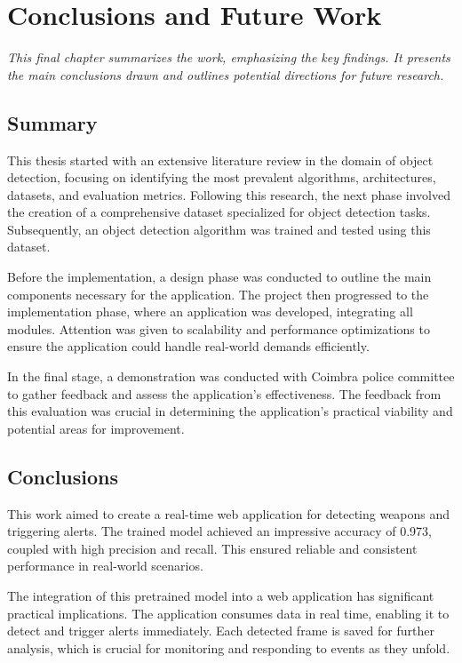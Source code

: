 \chapter{Conclusions and Future Work}
\label{chapter:conclusion}

\newenvironment{conclusion}
{\quote\itshape}
{\endquote}

\begin{conclusion}
    This final chapter summarizes the work, emphasizing the key findings. It presents the main 
    conclusions drawn and outlines potential directions for future research.
\end{conclusion}

\section{Summary}
This thesis started with an extensive literature review in the domain of object detection, focusing on 
identifying the most prevalent algorithms, architectures, datasets, and evaluation metrics. Following this 
research, the next phase involved the creation of a comprehensive dataset specialized for object 
detection tasks. Subsequently, an object detection algorithm was trained and tested using this dataset.

Before the implementation, a design phase was conducted to outline the main components necessary for the application.
The project then progressed to the implementation phase, where an application was developed, integrating all 
modules. Attention was given to scalability and performance optimizations to ensure the application 
could handle real-world demands efficiently.

In the final stage, a demonstration was conducted with Coimbra police committee to gather feedback and assess 
the application's effectiveness. The feedback from this evaluation was crucial in determining the application's 
practical viability and potential areas for improvement.

\section{Conclusions}
This work aimed to create a real-time web application for detecting weapons and triggering alerts.
The trained model achieved an impressive accuracy of 0.973, coupled with high precision and recall. This ensured 
reliable and consistent performance in real-world scenarios.

The integration of this pretrained model into a web application has significant practical implications. The application 
consumes data in real time, enabling it to detect and trigger alerts immediately. Each detected frame is saved for 
further analysis, which is crucial for monitoring and responding to events as they unfold.

